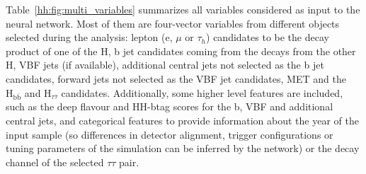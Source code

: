 \documentclass[../main.tex]{subfiles}
\begin{document}
Table~\ref{hh:fig:multi_variables} summarizes all variables considered as input to the neural network. Most of them are four-vector variables from different objects selected during the analysis: lepton (e, $\mu$ or $\tau_h$) candidates to be the decay product of one of the H, b jet candidates coming from the decays from the other H, VBF jets (if available), additional central jets not selected as the b jet candidates, forward jets not selected as the VBF jet candidates, MET and the $\text{H}_{\text{b}\bar{\text{b}}}$ and $\text{H}_{\tau\bar{\tau}}$ candidates. Additionally, some higher level features are included, such as the deep flavour and HH-btag scores for the b, VBF and additional central jets, and categorical features to provide information about the year of the input sample (so differences in detector alignment, trigger configurations or tuning parameters of the simulation can be inferred by the network) or the decay channel of the selected $\tau\tau$ pair.
\end{document}
